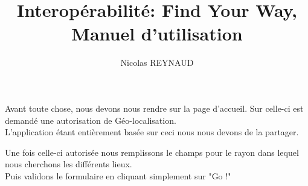\documentclass[10pt,a4paper, landscape]{report}
\author{Nicolas REYNAUD}
\title{ Interopérabilité: Find Your Way, Manuel d'utilisation}
\begin{document}
\maketitle
\newpage

\renewcommand{\contentsname}{Sommaire}
\tableofcontents
\newpage

\center
\section{}

Avant toute chose, nous devons nous rendre sur la page d'accueil. Sur celle-ci est demandé une autorisation de Géo-localisation.\\
L'application étant entièrement basée sur ceci nous nous devons de la partager.\\
{%
\setlength{\fboxsep}{0pt}%
\setlength{\fboxrule}{2pt}%
%

\newpage
Une fois celle-ci autorisée nous remplissons le champs pour le rayon dans lequel nous cherchons les différents lieux. \\
Puis validons le formulaire en cliquant simplement sur "Go !" \\
{%
\setlength{\fboxsep}{0pt}%
\setlength{\fboxrule}{2pt}%
%

}}
\end{document}

